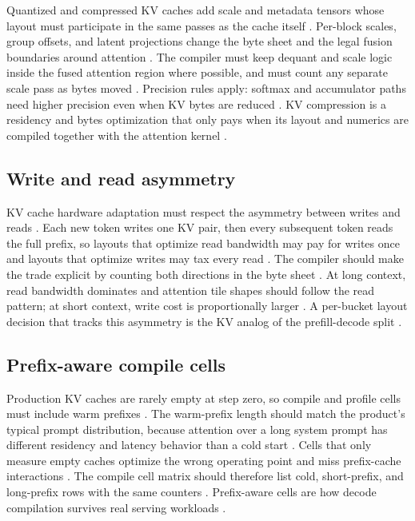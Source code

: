 Quantized and compressed KV caches add scale and metadata tensors whose layout must participate in the same passes as the cache itself \citep{liu2024deepseekv3,patel2025llminference,semianalysis2024tma}. Per-block scales, group offsets, and latent projections change the byte sheet and the legal fusion boundaries around attention \citep{memoryfloor2026,dao2022flashattention}. The compiler must keep dequant and scale logic inside the fused attention region where possible, and must count any separate scale pass as bytes moved \citep{chen2020compilerbasedhardw,patel2025llminference}. Precision rules apply: softmax and accumulator paths need higher precision even when KV bytes are reduced \citep{dao2022flashattention,memoryfloor2026}. KV compression is a residency and bytes optimization that only pays when its layout and numerics are compiled together with the attention kernel \citep{liu2024deepseekv3,memoryfloor2026}.

\subsection{Write and read asymmetry}

KV cache hardware adaptation must respect the asymmetry between writes and reads \citep{kwon2023vllm,patel2025llminference,memoryfloor2026}. Each new token writes one KV pair, then every subsequent token reads the full prefix, so layouts that optimize read bandwidth may pay for writes once and layouts that optimize writes may tax every read \citep{dao2023flashdecoding,memoryfloor2026}. The compiler should make the trade explicit by counting both directions in the byte sheet \citep{chen2020compilerbasedhardw,taxbreak2026}. At long context, read bandwidth dominates and attention tile shapes should follow the read pattern; at short context, write cost is proportionally larger \citep{patel2025llminference,memoryfloor2026}. A per-bucket layout decision that tracks this asymmetry is the KV analog of the prefill-decode split \citep{kwon2023vllm,memoryfloor2026}.

\subsection{Prefix-aware compile cells}

Production KV caches are rarely empty at step zero, so compile and profile cells must include warm prefixes \citep{kwon2023vllm,patel2025llminference,taxbreak2026}. The warm-prefix length should match the product's typical prompt distribution, because attention over a long system prompt has different residency and latency behavior than a cold start \citep{memoryfloor2026,patel2025llminference}. Cells that only measure empty caches optimize the wrong operating point and miss prefix-cache interactions \citep{chen2020compilerbasedhardw,memoryfloor2026}. The compile cell matrix should therefore list cold, short-prefix, and long-prefix rows with the same counters \citep{patel2025llminference,taxbreak2026}. Prefix-aware cells are how decode compilation survives real serving workloads \citep{kwon2023vllm,memoryfloor2026}.

